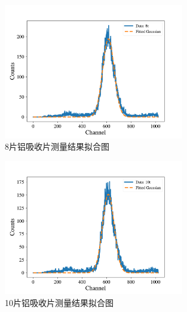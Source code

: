 \documentclass{article}
\begin{document}
    \begin{figure}[htbp]
        \centering
        \includegraphics[width=0.7\textwidth]{../plot/Fitted_8t.pdf}
        \caption{8片铝吸收片测量结果拟合图\label{fig:Fitted_8t}}
    \end{figure}
    \begin{figure}[htbp]
        \centering
        \includegraphics[width=0.7\textwidth]{../plot/Fitted_10t.pdf}
        \caption{10片铝吸收片测量结果拟合图\label{fig:Fitted_10t}}
    \end{figure}
\end{document}
